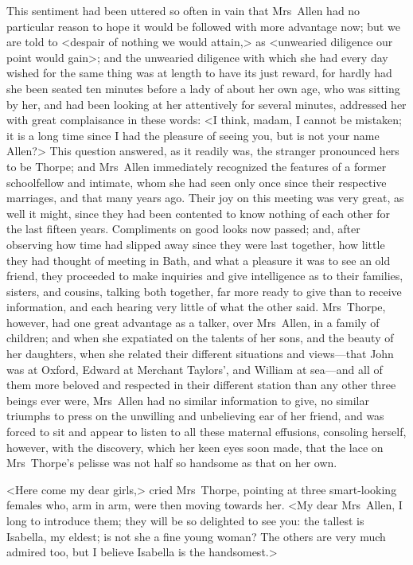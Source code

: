  This sentiment had been uttered so often in vain that Mrs~Allen had no particular reason to hope it would be followed with more advantage now; but we are told to <despair of nothing we would attain,> as <unwearied diligence our point would gain>; and the unwearied diligence with which she had every day wished for the same thing was at length to have its just reward, for hardly had she been seated ten minutes before a lady of about her own age, who was sitting by her, and had been looking at her attentively for several minutes, addressed her with great complaisance in these words: <I think, madam, I cannot be mistaken; it is a long time since I had the pleasure of seeing you, but is not your name Allen?> This question answered, as it readily was, the stranger pronounced hers to be Thorpe; and Mrs~Allen immediately recognized the features of a former schoolfellow and intimate, whom she had seen only once since their respective marriages, and that many years ago. Their joy on this meeting was very great, as well it might, since they had been contented to know nothing of each other for the last fifteen years. Compliments on good looks now passed; and, after observing how time had slipped away since they were last together, how little they had thought of meeting in Bath, and what a pleasure it was to see an old friend, they proceeded to make inquiries and give intelligence as to their families, sisters, and cousins, talking both together, far more ready to give than to receive information, and each hearing very little of what the other said. Mrs~Thorpe, however, had one great advantage as a talker, over Mrs~Allen, in a family of children; and when she expatiated on the talents of her sons, and the beauty of her daughters, when she related their different situations and views—that John was at Oxford, Edward at Merchant Taylors', and William at sea—and all of them more beloved and respected in their different station than any other three beings ever were, Mrs~Allen had no similar information to give, no similar triumphs to press on the unwilling and unbelieving ear of her friend, and was forced to sit and appear to listen to all these maternal effusions, consoling herself, however, with the discovery, which her keen eyes soon made, that the lace on Mrs~Thorpe's pelisse was not half so handsome as that on her own. 

 <Here come my dear girls,> cried Mrs~Thorpe, pointing at three smart-looking females who, arm in arm, were then moving towards her. <My dear Mrs~Allen, I long to introduce them; they will be so delighted to see you: the tallest is Isabella, my eldest; is not she a fine young woman? The others are very much admired too, but I believe Isabella is the handsomest.> 

